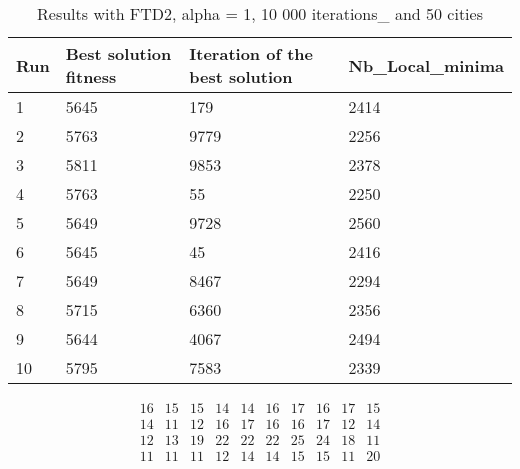 \documentclass[12pt,oneside,a4paper]{article}
\begin{document}
\begin{table}[h]
  \centering
  \small
  \begin{tabular}{llll}
    \hline
    \multicolumn{1}{|l|}{\textbf{Run}}& \multicolumn{1}{l|}{\textbf{Best solution fitness}}& \multicolumn{1}{l|}{\textbf{Iteration of the best solution}}& \multicolumn{1}{l|}{\textbf{Nb\_Local\_minima}}\\ \hline
    \multicolumn{1}{|l|}{1} & \multicolumn{1}{l|}{5645}  & \multicolumn{1}{l|}{179} & \multicolumn{1}{l|}{2414}  \\ \hline
    \multicolumn{1}{|l|}{2} & \multicolumn{1}{l|}{5763}  & \multicolumn{1}{l|}{9779} & \multicolumn{1}{l|}{2256}  \\ \hline
    \multicolumn{1}{|l|}{3} & \multicolumn{1}{l|}{5811}  & \multicolumn{1}{l|}{9853}  & \multicolumn{1}{l|}{2378}  \\ \hline
    \multicolumn{1}{|l|}{4} & \multicolumn{1}{l|}{5763}  & \multicolumn{1}{l|}{55}  & \multicolumn{1}{l|}{2250}  \\ \hline
    \multicolumn{1}{|l|}{5} & \multicolumn{1}{l|}{5649}  & \multicolumn{1}{l|}{9728}  & \multicolumn{1}{l|}{2560}  \\ \hline
    \multicolumn{1}{|l|}{6} & \multicolumn{1}{l|}{5645}  & \multicolumn{1}{l|}{45}  & \multicolumn{1}{l|}{2416}  \\ \hline
    \multicolumn{1}{|l|}{7} & \multicolumn{1}{l|}{5649}  & \multicolumn{1}{l|}{8467}  & \multicolumn{1}{l|}{2294}  \\ \hline
    \multicolumn{1}{|l|}{8} & \multicolumn{1}{l|}{5715}  & \multicolumn{1}{l|}{6360} & \multicolumn{1}{l|}{2356}  \\ \hline
    \multicolumn{1}{|l|}{9} & \multicolumn{1}{l|}{5644}  & \multicolumn{1}{l|}{4067} & \multicolumn{1}{l|}{2494}  \\ \hline
    \multicolumn{1}{|l|}{10} & \multicolumn{1}{l|}{5795}  & \multicolumn{1}{l|}{7583} & \multicolumn{1}{l|}{2339}  \\ \hline
  \end{tabular}
  \caption{Results with FTD2, alpha = 1, 10 000 iterations\_ and 50 cities}
\end{table}

\begin{equation}
  \tag{Mean Tabu Duration by city table 16}
  \begin{smallmatrix} 
16 & 15 & 15 & 14 & 14 & 16 & 17 & 16 & 17 & 15 \\
14 & 11 & 12 & 16 & 17 & 16 & 16 & 17 & 12 & 14 \\
12 & 13 & 19 & 22 & 22 & 22 & 25 & 24 & 18 & 11 \\
11 & 11 & 11 & 12 & 14 & 14 & 15 & 15 & 11 & 20
  \end{smallmatrix}
\end{equation}
\end{document}
